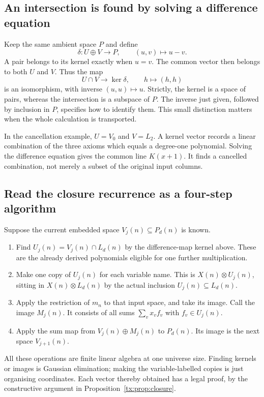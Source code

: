 \documentclass[11pt,a4paper,oneside,openany]{book}
\theoremstyle{definition}\newtheorem{definition}[theorem]{Definition}
\theoremstyle{remark}\newtheorem{remark}[theorem]{Remark}
\numberwithin{equation}{chapter}
\begin{document}
\subsection{An intersection is found by solving a difference equation}
Keep the same ambient space $P$ and define
\[
              \delta:U\oplus V\to P,\qquad(u,v)\mapsto u-v.
\]
A pair belongs to its kernel exactly when $u=v$. The common vector
then belongs to both $U$ and $V$. Thus the map
\[
                  U\cap V\longrightarrow\ker\delta,
                              \qquad h\mapsto(h,h)
\]
is an isomorphism, with inverse $(u,u)\mapsto u$.
Strictly, the kernel is a space of pairs, whereas the intersection
is a subspace of $P$. The inverse just given, followed by inclusion
in $P$, specifies how to identify them.
This small distinction matters when the whole calculation is transported.

In the cancellation example, $U=V_0$ and $V=L_2$.
A kernel vector records a linear combination of the three axioms
which equals a degree-one polynomial. Solving the difference equation
gives the common line $K(x+1)$. It finds a cancelled combination,
not merely a subset of the original input columns.

\subsection{Read the closure recurrence as a four-step algorithm}
Suppose the current embedded space $V_j(n)\subseteq P_d(n)$ is known.
\begin{enumerate}
\item Find $U_j(n)=V_j(n)\cap L_d(n)$ by the difference-map kernel
      above. These are the already derived polynomials eligible
      for one further multiplication.
\item Make one copy of $U_j(n)$ for each variable name.
      This is $X(n)\otimes U_j(n)$, sitting in
      $X(n)\otimes L_d(n)$ by the actual inclusion $U_j(n)\subseteq L_d(n)$.
\item Apply the restriction of $m_n$ to that input space, and take
      its image. Call the image $M_j(n)$. It consists of all sums
      $\sum_v x_vf_v$ with $f_v\in U_j(n)$.
\item Apply the sum map from $V_j(n)\oplus M_j(n)$ to $P_d(n)$.
      Its image is the next space $V_{j+1}(n)$.
\end{enumerate}
All these operations are finite linear algebra at one universe size.
Finding kernels or images is Gaussian elimination; making the
variable-labelled copies is just organising coordinates.
Each vector thereby obtained has a legal proof, by the constructive
argument in Proposition~\ref{tx:prop:closure}.
\end{document}
